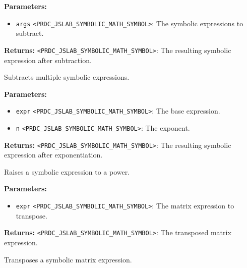 \documentclass[12pt,a4paper]{article}
\begin{document}
\vspace{5mm}
\noindent {}


\noindent \textbf{Parameters:}
\begin{itemize}
  \item \texttt{args} \texttt{<PRDC\_JSLAB\_SYMBOLIC\_MATH\_SYMBOL>}: The symbolic expressions to subtract.
\end{itemize}

\noindent \textbf{Returns:} \texttt{<PRDC\_JSLAB\_SYMBOLIC\_MATH\_SYMBOL>}: The resulting symbolic expression after subtraction.

\noindent Subtracts multiple symbolic expressions.

\vspace{5mm}
\noindent {}


\noindent \textbf{Parameters:}
\begin{itemize}
  \item \texttt{expr} \texttt{<PRDC\_JSLAB\_SYMBOLIC\_MATH\_SYMBOL>}: The base expression.
  \item \texttt{n} \texttt{<PRDC\_JSLAB\_SYMBOLIC\_MATH\_SYMBOL>}: The exponent.
\end{itemize}

\noindent \textbf{Returns:} \texttt{<PRDC\_JSLAB\_SYMBOLIC\_MATH\_SYMBOL>}: The resulting symbolic expression after exponentiation.

\noindent Raises a symbolic expression to a power.

\vspace{5mm}
\noindent {}


\noindent \textbf{Parameters:}
\begin{itemize}
  \item \texttt{expr} \texttt{<PRDC\_JSLAB\_SYMBOLIC\_MATH\_SYMBOL>}: The matrix expression to transpose.
\end{itemize}

\noindent \textbf{Returns:} \texttt{<PRDC\_JSLAB\_SYMBOLIC\_MATH\_SYMBOL>}: The transposed matrix expression.

\noindent Transposes a symbolic matrix expression.
\end{document}
